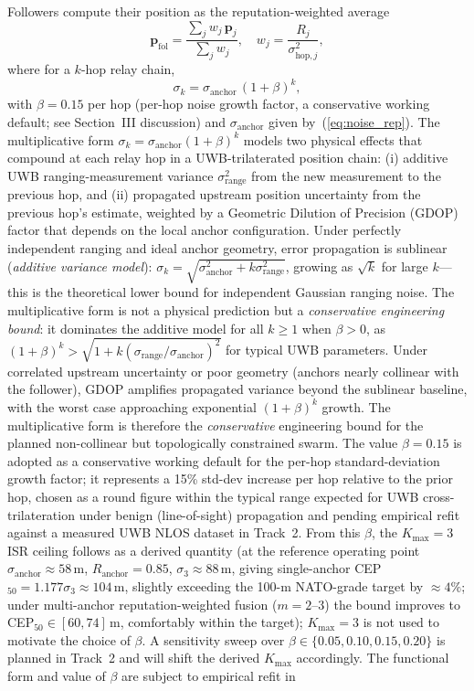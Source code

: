 \documentclass[conference,10pt]{IEEEtran}
\begin{document}
Followers compute their position as the reputation-weighted average
\begin{equation}
\mathbf{p}_\text{fol} = \frac{\sum_j w_j\, \mathbf{p}_j}{\sum_j w_j}, \quad w_j = \frac{R_j}{\sigma_{\text{hop},j}^2},
\label{eq:fusion}
\end{equation}
where for a $k$-hop relay chain,
\begin{equation}
\sigma_k = \sigma_\text{anchor}\, (1 + \beta)^k,
\label{eq:hop}
\end{equation}
with $\beta = 0.15$ per hop (per-hop noise growth factor, a conservative working default; see Section~III discussion) and $\sigma_\text{anchor}$ given by~(\ref{eq:noise_rep}). The multiplicative form $\sigma_k = \sigma_\text{anchor}(1+\beta)^k$ models two physical effects that compound at each relay hop in a UWB-trilaterated position chain: (i) additive UWB ranging-measurement variance $\sigma_\text{range}^2$ from the new measurement to the previous hop, and (ii) propagated upstream position uncertainty from the previous hop's estimate, weighted by a Geometric Dilution of Precision (GDOP) factor that depends on the local anchor configuration. Under perfectly independent ranging and ideal anchor geometry, error propagation is sublinear (\emph{additive variance model}): $\sigma_k = \sqrt{\sigma_\text{anchor}^2 + k\sigma_\text{range}^2}$, growing as $\sqrt{k}$ for large $k$---this is the theoretical lower bound for independent Gaussian ranging noise. The multiplicative form is not a physical prediction but a \emph{conservative engineering bound}: it dominates the additive model for all $k \geq 1$ when $\beta > 0$, as $(1+\beta)^k > \sqrt{1 + k(\sigma_\text{range}/\sigma_\text{anchor})^2}$ for typical UWB parameters. Under correlated upstream uncertainty or poor geometry (anchors nearly collinear with the follower), GDOP amplifies propagated variance beyond the sublinear baseline, with the worst case approaching exponential $(1+\beta)^k$ growth. The multiplicative form is therefore the \emph{conservative} engineering bound for the planned non-collinear but topologically constrained swarm. The value $\beta = 0.15$ is adopted as a conservative working default for the per-hop standard-deviation growth factor; it represents a 15\% std-dev increase per hop relative to the prior hop, chosen as a round figure within the typical range expected for UWB cross-trilateration under benign (line-of-sight) propagation and pending empirical refit against a measured UWB NLOS dataset in Track~2. From this $\beta$, the $K_\text{max}=3$ ISR ceiling follows as a derived quantity (at the reference operating point $\sigma_\text{anchor}\approx 58$\,m, $R_\text{anchor}=0.85$, $\sigma_3 \approx 88$\,m, giving single-anchor CEP$_{50}=1.177\sigma_3 \approx 104$\,m, slightly exceeding the 100-m NATO-grade target by $\approx 4\%$; under multi-anchor reputation-weighted fusion ($m{=}2$--$3$) the bound improves to CEP$_{50}\in[60,74]$\,m, comfortably within the target); $K_\text{max}=3$ is not used to motivate the choice of $\beta$. A sensitivity sweep over $\beta \in \{0.05, 0.10, 0.15, 0.20\}$ is planned in Track~2 and will shift the derived $K_\text{max}$ accordingly. The functional form and value of $\beta$ are subject to empirical refit in 
\end{document}
